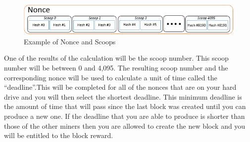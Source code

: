 \begin{figure}[H]
    \begin{center}
        \begin{minipage}{\linewidth}
            \begin{center}
                \includegraphics[width=\textwidth,keepaspectratio]{img/poc_scoops.png}
                \caption{Example of Nonce and Scoops \cite{poc}}
                \label{obr 1.2.1}
            \end{center}
        \end{minipage}
    \end{center}
\end{figure}

One of the results of the calculation will be the scoop number. This scoop number will be between 0 and 4,095. The resulting scoop number and the corresponding nonce will be used to calculate a unit of time called the “deadline”.This will be completed for all of the nonces that are on your hard drive and you will then select the shortest deadline. This minimum deadline is the amount of time that will pass since the last block was created until you can produce a new one. If the deadline that you are able to produce is shorter than those of the other miners then you are allowed to create the new block and you will be entitled to the block reward. \cite{poc}
